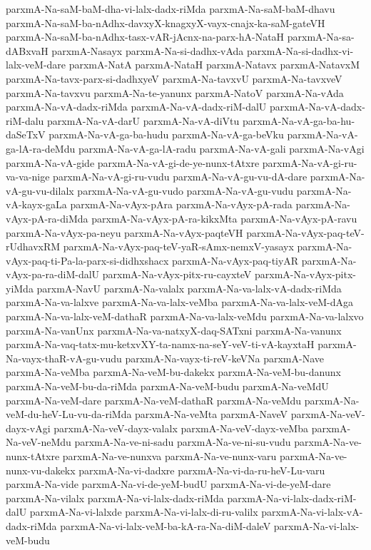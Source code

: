 {parxmA-Na-saM-baM-dha-vi-lalx-dadx-riMda
parxmA-Na-saM-baM-dhavu
parxmA-Na-saM-ba-nAdhx-davxyX-knagxyX-vayx-cnajx-ka-saM-gateVH
parxmA-Na-saM-ba-nAdhx-tasx-vAR-jAcnx-na-parx-hA-NataH
parxmA-Na-sa-dABxvaH
parxmA-Nasayx
parxmA-Na-si-dadhx-vAda
parxmA-Na-si-dadhx-vi-lalx-veM-dare
parxmA-NatA
parxmA-NataH
parxmA-Natavx
parxmA-NatavxM
parxmA-Na-tavx-parx-si-dadhxyeV
parxmA-Na-tavxvU
parxmA-Na-tavxveV
parxmA-Na-tavxvu
parxmA-Na-te-yanunx
parxmA-NatoV
parxmA-Na-vAda
parxmA-Na-vA-dadx-riMda
parxmA-Na-vA-dadx-riM-dalU
parxmA-Na-vA-dadx-riM-dalu
parxmA-Na-vA-darU
parxmA-Na-vA-diVtu
parxmA-Na-vA-ga-ba-hu-daSeTxV
parxmA-Na-vA-ga-ba-hudu
parxmA-Na-vA-ga-beVku
parxmA-Na-vA-ga-lA-ra-deMdu
parxmA-Na-vA-ga-lA-radu
parxmA-Na-vA-gali
parxmA-Na-vAgi
parxmA-Na-vA-gide
parxmA-Na-vA-gi-de-ye-nunx-tAtxre
parxmA-Na-vA-gi-ru-va-va-nige
parxmA-Na-vA-gi-ru-vudu
parxmA-Na-vA-gu-vu-dA-dare
parxmA-Na-vA-gu-vu-dilalx
parxmA-Na-vA-gu-vudo
parxmA-Na-vA-gu-vudu
parxmA-Na-vA-kayx-gaLa
parxmA-Na-vAyx-pAra
parxmA-Na-vAyx-pA-rada
parxmA-Na-vAyx-pA-ra-diMda
parxmA-Na-vAyx-pA-ra-kikxMta
parxmA-Na-vAyx-pA-ravu
parxmA-Na-vAyx-pa-neyu
parxmA-Na-vAyx-paqteVH
parxmA-Na-vAyx-paq-teV-rUdhavxRM
parxmA-Na-vAyx-paq-teV-yaR-sAmx-nemxV-yasayx
parxmA-Na-vAyx-paq-ti-Pa-la-parx-si-didhxshacx
parxmA-Na-vAyx-paq-tiyAR
parxmA-Na-vAyx-pa-ra-diM-dalU
parxmA-Na-vAyx-pitx-ru-cayxteV
parxmA-Na-vAyx-pitx-yiMda
parxmA-NavU
parxmA-Na-valalx
parxmA-Na-va-lalx-vA-dadx-riMda
parxmA-Na-va-lalxve
parxmA-Na-va-lalx-veMba
parxmA-Na-va-lalx-veM-dAga
parxmA-Na-va-lalx-veM-dathaR
parxmA-Na-va-lalx-veMdu
parxmA-Na-va-lalxvo
parxmA-Na-vanUnx
parxmA-Na-va-natxyX-daq-SATxni
parxmA-Na-vanunx
parxmA-Na-vaq-tatx-mu-ketxvXY-ta-namx-na-seY-veV-ti-vA-kayxtaH
parxmA-Na-vayx-thaR-vA-gu-vudu
parxmA-Na-vayx-ti-reV-keVNa
parxmA-Nave
parxmA-Na-veMba
parxmA-Na-veM-bu-dakekx
parxmA-Na-veM-bu-danunx
parxmA-Na-veM-bu-da-riMda
parxmA-Na-veM-budu
parxmA-Na-veMdU
parxmA-Na-veM-dare
parxmA-Na-veM-dathaR
parxmA-Na-veMdu
parxmA-Na-veM-du-heV-Lu-vu-da-riMda
parxmA-Na-veMta
parxmA-NaveV
parxmA-Na-veV-dayx-vAgi
parxmA-Na-veV-dayx-valalx
parxmA-Na-veV-dayx-veMba
parxmA-Na-veV-neMdu
parxmA-Na-ve-ni-sadu
parxmA-Na-ve-ni-su-vudu
parxmA-Na-ve-nunx-tAtxre
parxmA-Na-ve-nunxva
parxmA-Na-ve-nunx-varu
parxmA-Na-ve-nunx-vu-dakekx
parxmA-Na-vi-dadxre
parxmA-Na-vi-da-ru-heV-Lu-varu
parxmA-Na-vide
parxmA-Na-vi-de-yeM-budU
parxmA-Na-vi-de-yeM-dare
parxmA-Na-vilalx
parxmA-Na-vi-lalx-dadx-riMda
parxmA-Na-vi-lalx-dadx-riM-dalU
parxmA-Na-vi-lalxde
parxmA-Na-vi-lalx-di-ru-valilx
parxmA-Na-vi-lalx-vA-dadx-riMda
parxmA-Na-vi-lalx-veM-ba-kA-ra-Na-diM-daleV
parxmA-Na-vi-lalx-veM-budu
}
